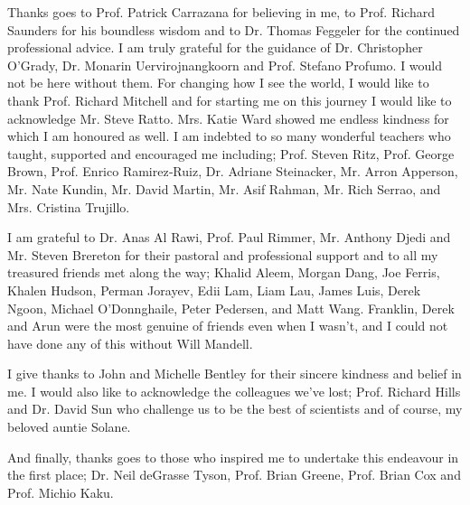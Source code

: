 \begin{acknowledgements}
Thanks goes to Prof. Patrick Carrazana for believing in me, to Prof. Richard Saunders for his boundless wisdom and to Dr. Thomas Feggeler for the continued professional advice. I am truly grateful for the guidance of Dr. Christopher O’Grady, Dr. Monarin Uervirojnangkoorn and Prof. Stefano Profumo. I would not be here without them. For changing how I see the world, I would like to thank Prof. Richard Mitchell and for starting me on this journey I would like to acknowledge Mr. Steve Ratto. Mrs. Katie Ward showed me endless kindness for which I am honoured as well. I am indebted to so many wonderful teachers who taught, supported and encouraged me including; Prof. Steven Ritz, Prof. George Brown, Prof. Enrico Ramirez‑Ruiz, Dr. Adriane Steinacker, Mr. Arron Apperson, Mr. Nate Kundin, Mr. David Martin, Mr. Asif Rahman, Mr. Rich Serrao, and Mrs. Cristina Trujillo.

I am grateful to Dr. Anas Al Rawi, Prof. Paul Rimmer, Mr. Anthony Djedi and Mr. Steven Brereton for their pastoral and professional support and to all my treasured friends met along the way; Khalid Aleem, Morgan Dang, Joe Ferris, Khalen Hudson, Perman Jorayev, Edii Lam, Liam Lau, James Luis, Derek Ngoon, Michael O'Donnghaile, Peter Pedersen, and Matt Wang. Franklin, Derek and Arun were the most genuine of friends even when I wasn’t, and I could not have done any of this without Will Mandell.

I give thanks to John and Michelle Bentley for their sincere kindness and belief in me. I would also like to acknowledge the colleagues we’ve lost; Prof. Richard Hills and Dr. David Sun who challenge us to be the best of scientists and of course, my beloved auntie Solane.

And finally, thanks goes to those who inspired me to undertake this endeavour in the first place; Dr. Neil deGrasse Tyson, Prof. Brian Greene, Prof. Brian Cox and Prof. Michio Kaku.

\end{acknowledgements}
